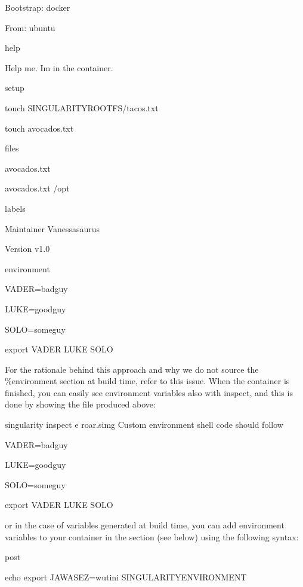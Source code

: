 \documentclass[letterpaper,10pt,english]{sphinxmanual}
\begin{document}
%
\begin{sphinxVerbatim}[commandchars=\\\{\}]
Bootstrap: docker

From: ubuntu


\PYGZpc{}help

Help me. I\PYGZsq{}m in the container.


\PYGZpc{}setup

    touch \PYGZdl{}\PYGZob{}SINGULARITY\PYGZus{}ROOTFS\PYGZcb{}/tacos.txt

    touch avocados.txt


\PYGZpc{}files

    avocados.txt

    avocados.txt /opt


\PYGZpc{}labels

    Maintainer Vanessasaurus

    Version v1.0


\PYGZpc{}environment

    VADER=badguy

    LUKE=goodguy

    SOLO=someguy

    export VADER LUKE SOLO
\end{sphinxVerbatim}

For the rationale behind this approach and why we do not source the
\%environment section at build time, refer to this issue. When the
container is finished, you can easily see environment variables also
with inspect, and this is done by showing the file produced above:

%
\begin{sphinxVerbatim}[commandchars=\\\{\}]
\PYGZdl{} singularity inspect \PYGZhy{}e roar.simg \PYGZsh{} Custom environment shell code should follow


    VADER=badguy

    LUKE=goodguy

    SOLO=someguy

    export VADER LUKE SOLO
\end{sphinxVerbatim}

or in the case of variables generated at build time, you can add
environment variables to your container in the  section (see below) using
the following syntax:

%
\begin{sphinxVerbatim}[commandchars=\\\{\}]
\PYGZpc{}post

    echo \PYGZsq{}export JAWA\PYGZus{}SEZ=wutini\PYGZsq{} \PYGZgt{}\PYGZgt{} \PYGZdl{}SINGULARITY\PYGZus{}ENVIRONMENT
\end{sphinxVerbatim}
\end{document}
